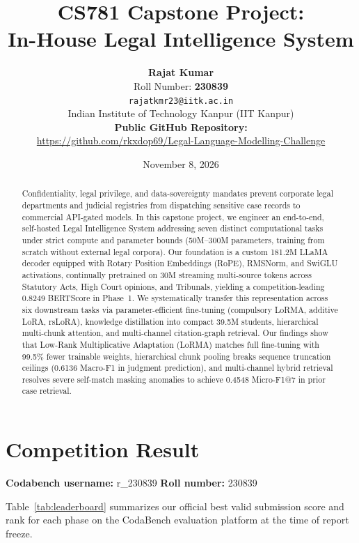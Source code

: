 \documentclass[11pt, oneside]{article}
\title{\textbf{CS781 Capstone Project:\\ In-House Legal Intelligence System}}
\author{
    \textbf{Rajat Kumar} \\
    Roll Number: \textbf{230839} \\
    {\tt rajatkmr23@iitk.ac.in} \\
    Indian Institute of Technology Kanpur (IIT Kanpur) \\[0.4em]
    \textbf{Public GitHub Repository:}\\ \url{https://github.com/rkxdop69/Legal-Language-Modelling-Challenge}
}
\date{November 8, 2026}
\begin{document}
\maketitle

\begin{abstract}
Confidentiality, legal privilege, and data-sovereignty mandates prevent corporate legal departments and judicial registries from dispatching sensitive case records to commercial API-gated models. In this capstone project, we engineer an end-to-end, self-hosted Legal Intelligence System addressing seven distinct computational tasks under strict compute and parameter bounds (50M--300M parameters, training from scratch without external legal corpora). Our foundation is a custom 181.2M LLaMA decoder equipped with Rotary Position Embeddings (RoPE), RMSNorm, and SwiGLU activations, continually pretrained on 30M streaming multi-source tokens across Statutory Acts, High Court opinions, and Tribunals, yielding a competition-leading 0.8249 BERTScore in Phase~1. We systematically transfer this representation across six downstream tasks via parameter-efficient fine-tuning (compulsory LoRMA, additive LoRA, rsLoRA), knowledge distillation into compact 39.5M students, hierarchical multi-chunk attention, and multi-channel citation-graph retrieval. Our findings show that Low-Rank Multiplicative Adaptation (LoRMA) matches full fine-tuning with 99.5\% fewer trainable weights, hierarchical chunk pooling breaks sequence truncation ceilings (0.6136 Macro-F1 in judgment prediction), and multi-channel hybrid retrieval resolves severe self-match masking anomalies to achieve 0.4548 Micro-F1@7 in prior case retrieval.
\end{abstract}

\section{Competition Result}
\noindent
\textbf{Codabench username:} r\_230839
\hfill
\textbf{Roll number:} 230839
\medskip

\noindent
Table~\ref{tab:leaderboard} summarizes our official best valid submission score and rank for each phase on the CodaBench evaluation platform at the time of report freeze.
\end{document}

